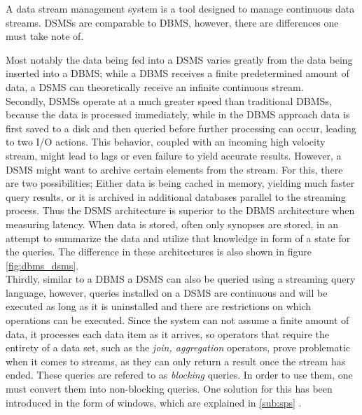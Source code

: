         A data stream management system is a tool designed to manage continuous data streams.
        DSMSs are comparable to DBMS, however, there are differences one must take note of.

        \quad Most notably the data being fed into a DSMS varies greatly from the data being inserted into a DBMS; while a DBMS receives a finite predetermined amount 
        of data, a DSMS can theoretically receive an infinite continuous stream.
        \\
        Secondly, DSMSs operate at a much greater speed than traditional DBMSs, because the data is processed immediately, while in the DBMS approach
        data is first saved to a disk and then queried before further processing can occur, leading to two I/O actions. This behavior, coupled with an incoming 
        high velocity stream, might lead to lags or even failure to yield accurate results\cite{StreamBookQuality}. 
        However, a DSMS might want to archive certain elements from the stream. For this, there are two possibilities;
        Either data is being cached in memory, yielding much faster query results, or it is archived in additional databases parallel to the streaming process.
        Thus the DSMS architecture is superior to the DBMS architecture when measuring latency.
        When data is stored, often only synopses are stored, in an attempt to summarize the data and utilize that knowledge in form of a \gls{state} for the queries.
        The difference in these architectures is also shown in figure \ref{fig:dbms_dsms}\cite{StreamBookQuality}.
        \\
        Thirdly, similar to a DBMS a DSMS can also be queried using a streaming query language, however, queries installed on a DSMS are continuous 
        and will be executed as long as it is uninstalled and there are restrictions on which operations can be executed.
        Since the system can not assume a finite amount of data, it processes each data item as it arrives, so operators that require the entirety of a data 
        set, such as the \textit{join, aggregation} operators, prove problematic when it comes to streams, 
        as they can only return a result once the stream has ended\cite[p.12]{StreamBookQuality}.
        These queries are refered to as \textit{blocking} queries. In order to use them, one must convert them into non-blocking queries.
        One solution for this has been introduced in the form of windows, which are explained in \ref{sub:sps} .

